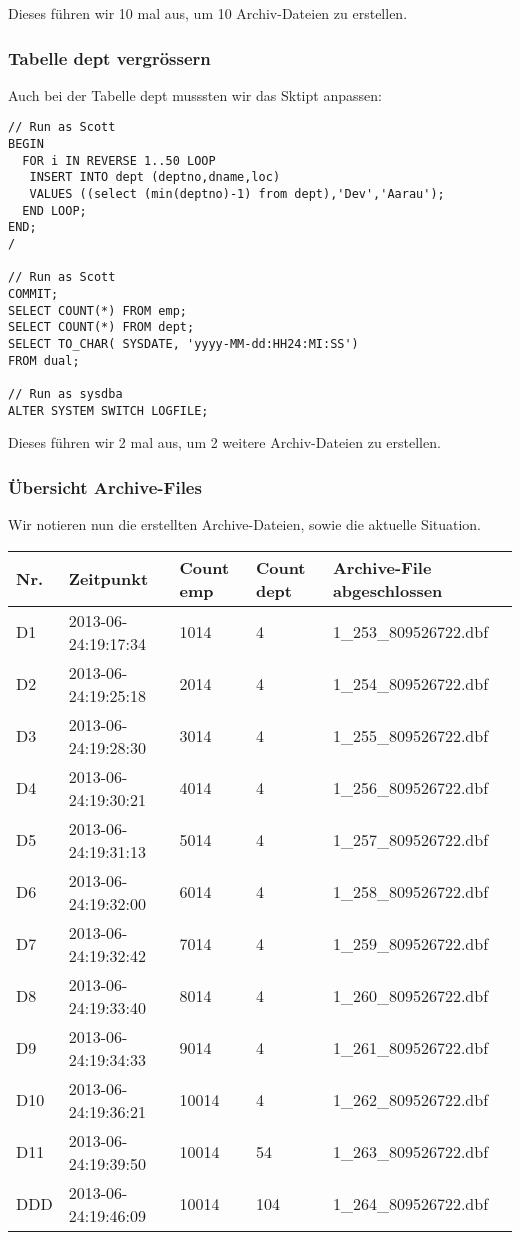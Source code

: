 \documentclass[11pt,a4paper,parskip=half]{scrartcl}
\begin{document}
Dieses führen wir 10 mal aus, um 10 Archiv-Dateien zu erstellen.

\subsubsection{Tabelle dept vergrössern}
Auch bei der Tabelle dept musssten wir das Sktipt anpassen:
\begin{lstlisting}
// Run as Scott
BEGIN
  FOR i IN REVERSE 1..50 LOOP
   INSERT INTO dept (deptno,dname,loc)
   VALUES ((select (min(deptno)-1) from dept),'Dev','Aarau');
  END LOOP;
END;
/

// Run as Scott
COMMIT;
SELECT COUNT(*) FROM emp;
SELECT COUNT(*) FROM dept;
SELECT TO_CHAR( SYSDATE, 'yyyy-MM-dd:HH24:MI:SS')
FROM dual;

// Run as sysdba
ALTER SYSTEM SWITCH LOGFILE;
\end{lstlisting}

Dieses führen wir 2 mal aus, um 2 weitere Archiv-Dateien zu erstellen.

\subsubsection{Übersicht Archive-Files}
Wir notieren nun die erstellten Archive-Dateien, sowie die aktuelle Situation.

\begin{center}
    \begin{tabular}{| l | l | l | l | l |}
    \hline
	Nr. & Zeitpunkt & Count emp & Count dept & Archive-File abgeschlossen \\ \hline
	D1 & 2013-06-24:19:17:34 & 1014 & 4 & 1\_253\_809526722.dbf \\ \hline
	D2 & 2013-06-24:19:25:18 & 2014 & 4 & 1\_254\_809526722.dbf \\ \hline
	D3 & 2013-06-24:19:28:30 & 3014 & 4 & 1\_255\_809526722.dbf \\ \hline
	D4 & 2013-06-24:19:30:21 & 4014 & 4 & 1\_256\_809526722.dbf \\ \hline
	D5 & 2013-06-24:19:31:13 & 5014 & 4 & 1\_257\_809526722.dbf \\ \hline
	D6 & 2013-06-24:19:32:00 & 6014 & 4 & 1\_258\_809526722.dbf \\ \hline
	D7 & 2013-06-24:19:32:42 & 7014 & 4 & 1\_259\_809526722.dbf \\ \hline
	D8 & 2013-06-24:19:33:40 & 8014 & 4 & 1\_260\_809526722.dbf \\ \hline
	D9 & 2013-06-24:19:34:33 & 9014 & 4 & 1\_261\_809526722.dbf \\ \hline
	D10 & 2013-06-24:19:36:21 & 10014 & 4 & 1\_262\_809526722.dbf \\ \hline
	D11 & 2013-06-24:19:39:50 & 10014 & 54 & 1\_263\_809526722.dbf \\ \hline
	DDD & 2013-06-24:19:46:09 & 10014 & 104 & 1\_264\_809526722.dbf \\ \hline
   \end{tabular}
\end{center}
\end{document}
